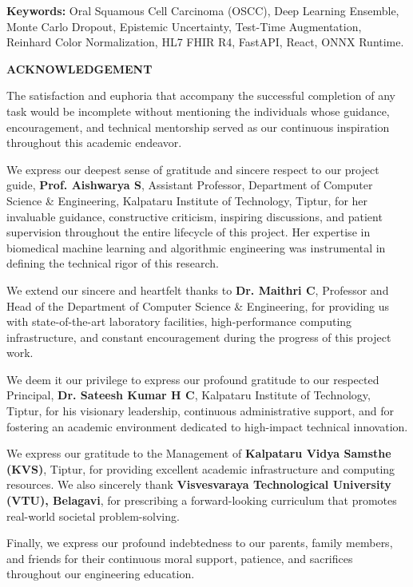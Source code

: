 \documentclass[12pt,a4paper,oneside]{report}
\newcommand{\guidename}{Prof. Aishwarya S}
\newcommand{\hodname}{Dr. Maithri C}
\newcommand{\principalname}{Dr. Sateesh Kumar H C}
\begin{document}
\vspace{0.6cm}
\noindent\textbf{Keywords:} Oral Squamous Cell Carcinoma (OSCC), Deep Learning Ensemble, Monte Carlo Dropout, Epistemic Uncertainty, Test-Time Augmentation, Reinhard Color Normalization, HL7 FHIR R4, FastAPI, React, ONNX Runtime.

\newpage
\thispagestyle{plain}
\begin{center}
\textbf{\fontsize{16}{19}\selectfont ACKNOWLEDGEMENT}\\[0.8cm]
\end{center}

The satisfaction and euphoria that accompany the successful completion of any task would be incomplete without mentioning the individuals whose guidance, encouragement, and technical mentorship served as our continuous inspiration throughout this academic endeavor.

We express our deepest sense of gratitude and sincere respect to our project guide, \textbf{\guidename}, Assistant Professor, Department of Computer Science \& Engineering, Kalpataru Institute of Technology, Tiptur, for her invaluable guidance, constructive criticism, inspiring discussions, and patient supervision throughout the entire lifecycle of this project. Her expertise in biomedical machine learning and algorithmic engineering was instrumental in defining the technical rigor of this research.

We extend our sincere and heartfelt thanks to \textbf{\hodname}, Professor and Head of the Department of Computer Science \& Engineering, for providing us with state-of-the-art laboratory facilities, high-performance computing infrastructure, and constant encouragement during the progress of this project work.

We deem it our privilege to express our profound gratitude to our respected Principal, \textbf{\principalname}, Kalpataru Institute of Technology, Tiptur, for his visionary leadership, continuous administrative support, and for fostering an academic environment dedicated to high-impact technical innovation.

We express our gratitude to the Management of \textbf{Kalpataru Vidya Samsthe (KVS)}, Tiptur, for providing excellent academic infrastructure and computing resources. We also sincerely thank \textbf{Visvesvaraya Technological University (VTU), Belagavi}, for prescribing a forward-looking curriculum that promotes real-world societal problem-solving.

Finally, we express our profound indebtedness to our parents, family members, and friends for their continuous moral support, patience, and sacrifices throughout our engineering education.
\end{document}
